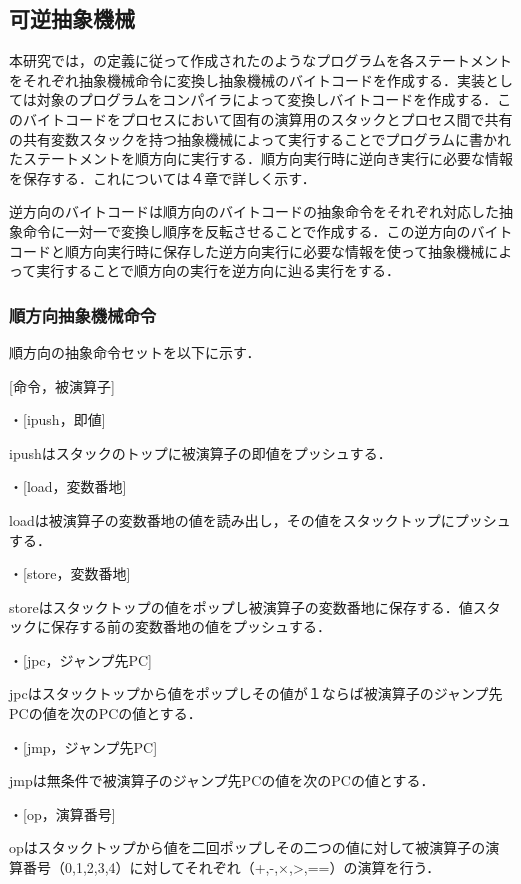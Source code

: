 \documentclass[submit,PRO]{ipsj}
\begin{document}
\subsection{可逆抽象機械}
\label{sec:format}

本研究では，の定義に従って作成されたのようなプログラムを各ステートメントをそれぞれ抽象機械命令に変換し抽象機械のバイトコードを作成する．実装としては対象のプログラムをコンパイラによって変換しバイトコードを作成する．このバイトコードをプロセスにおいて固有の演算用のスタックとプロセス間で共有の共有変数スタックを持つ抽象機械によって実行することでプログラムに書かれたステートメントを順方向に実行する．順方向実行時に逆向き実行に必要な情報を保存する．これについては４章で詳しく示す．

逆方向のバイトコードは順方向のバイトコードの抽象命令をそれぞれ対応した抽象命令に一対一で変換し順序を反転させることで作成する．この逆方向のバイトコードと順方向実行時に保存した逆方向実行に必要な情報を使って抽象機械によって実行することで順方向の実行を逆方向に辿る実行をする．


\subsubsection{順方向抽象機械命令}


順方向の抽象命令セットを以下に示す．

[命令，被演算子]


・[ipush，即値]

ipushはスタックのトップに被演算子の即値をプッシュする．


・[load，変数番地]

loadは被演算子の変数番地の値を読み出し，その値をスタックトップにプッシュする．


・[store，変数番地]

storeはスタックトップの値をポップし被演算子の変数番地に保存する．値スタックに保存する前の変数番地の値をプッシュする．


・[jpc，ジャンプ先PC]

jpcはスタックトップから値をポップしその値が１ならば被演算子のジャンプ先PCの値を次のPCの値とする．


・[jmp，ジャンプ先PC]

jmpは無条件で被演算子のジャンプ先PCの値を次のPCの値とする．

・[op，演算番号]

opはスタックトップから値を二回ポップしその二つの値に対して被演算子の演算番号（0,1,2,3,4）に対してそれぞれ（+,-,$\times$,>,==）の演算を行う．
\end{document}
